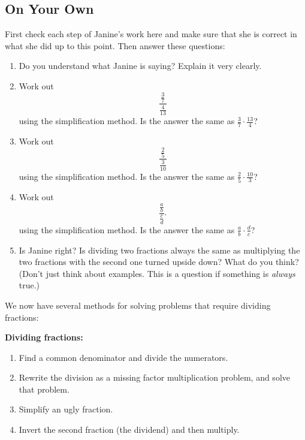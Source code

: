 \subsection*{On Your Own}
First check each step of Janine's work here and make sure that she is correct in what
she did up to this point.  Then answer these questions:
\begin{enumerate}
\item
Do you understand what Janine is saying?  Explain it very clearly.\\


\item
Work out
\[
\frac{\frac{3}{7}}{\frac4{13}}
\]
using the simplification method.  Is the answer the same as
$\frac 3 7 \cdot \frac{13}4$?\\

\item
Work out
\[
\frac{\frac{2}{5}}{\frac 3{10}}
\]
using the simplification method.  Is the answer the same as
$\frac 2 5 \cdot \frac{10}3$?\\

\item
Work out
\[
\frac{\frac{a}{b}}{\frac c{d}}.
\]
using the simplification method.  Is the answer the same as
$\frac a b \cdot \frac{d}c$?\\

\item
Is Janine right? Is dividing two fractions always the same as multiplying the
two fractions with the second one turned upside down? What do you think?  (Don't just think about  examples.  This is a question if something is \emph{always} true.)\\

\end{enumerate}


We now have several methods for solving problems that require dividing fractions:


\noindent
{\bf Dividing fractions:}
\begin{enumerate}
\item
Find a common denominator and divide the numerators.
\item
Rewrite the division as  a missing factor multiplication problem, and solve that problem.
\item
Simplify an ugly fraction.
\item
Invert the second fraction (the dividend) and then multiply.

\end{enumerate}


